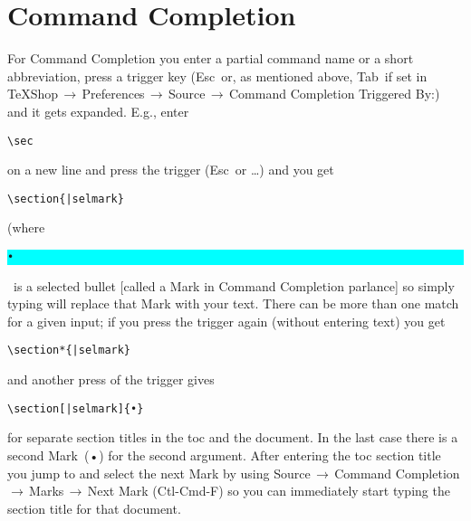 \documentclass[11pt]{article}
\newcommand{\esckey}{\textsf{Esc}}
\newcommand{\tabkey}{\textsf{Tab}}
\newcommand{\mnu}[1]{\textsf{#1}}
\newcommand{\cmd}[1]{\textsf{#1}}
\newcommand{\To}{\,\(\to\)\,}
\newcommand{\selmark}{\colorbox{cyan}{\rule[-0.5ex]{0ex}{2.1ex}\texttt{•}}}
\begin{document}
\section{\cmd{Command Completion}}

For \cmd{Command Completion} you enter a partial command name or a short abbreviation, press a trigger key (\esckey\ or, as mentioned above, \tabkey\ if set in \mnu{TeXShop}\To\mnu{Preferences}\To\mnu{Source}\To\mnu{Command Completion Triggered By:}) and it gets expanded. E.g., enter
\begin{verbatim}
\sec
\end{verbatim}
on a new line and press the trigger (\esckey\ or …) and you get
\begin{verbatim}
\section{|selmark}
\end{verbatim}
(where \selmark\ is a selected bullet [called a \cmd{Mark} in \cmd{Command Completion} parlance] so simply typing will replace that \cmd{Mark} with your text. There can be more than one match for a given input; if you press the trigger again (without entering text) you get
\begin{verbatim}
\section*{|selmark}
\end{verbatim}
and another press of the trigger gives
\begin{verbatim}
\section[|selmark]{•}
\end{verbatim}
for separate section titles in the \cmd{toc} and the document. In the last case there is a second \cmd{Mark}~(•) for the second argument. After entering the \cmd{toc} section title you jump to and select the next \cmd{Mark} by using \mnu{Source}\To\mnu{Command Completion}\To\mnu{Marks}\To\mnu{Next Mark} (\cmd{Ctl-Cmd-F}) so you can immediately start typing the section title for that document.
\end{document}
